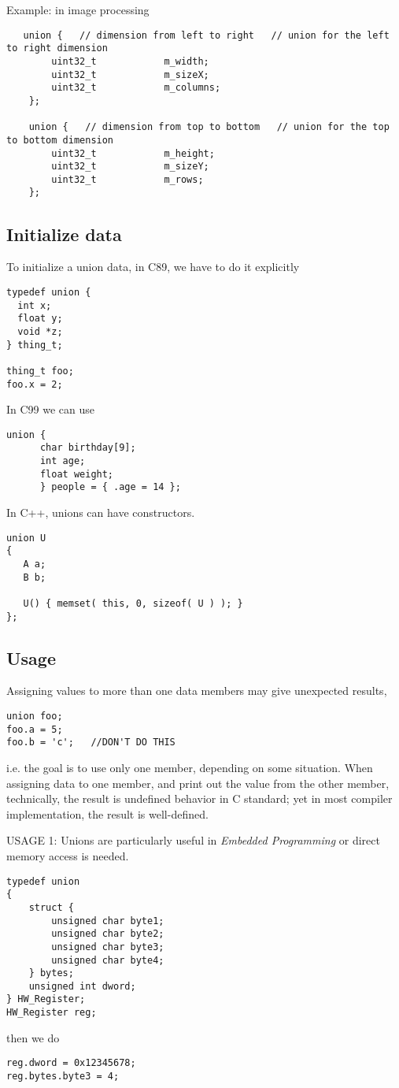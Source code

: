 Example: in image processing
\begin{Verbatim}
   union {   // dimension from left to right   // union for the left to right dimension
        uint32_t            m_width;
        uint32_t            m_sizeX;
        uint32_t            m_columns;
    };

    union {   // dimension from top to bottom   // union for the top to bottom dimension
        uint32_t            m_height;
        uint32_t            m_sizeY;
        uint32_t            m_rows;
    };
\end{Verbatim}

\subsection{Initialize data}

To initialize a union data, in C89, we have to do it explicitly
\begin{lstlisting}
typedef union {
  int x;
  float y;
  void *z;
} thing_t;

thing_t foo;
foo.x = 2;
\end{lstlisting}

In C99 we can use
\begin{lstlisting}
union {
      char birthday[9];
      int age;
      float weight;
      } people = { .age = 14 };
\end{lstlisting}

In C++, unions can have constructors.
\begin{lstlisting}
union U 
{
   A a;
   B b;

   U() { memset( this, 0, sizeof( U ) ); }
};
\end{lstlisting}


\subsection{Usage}
Assigning values to more than one data members may give unexpected results,
\begin{verbatim}
union foo;
foo.a = 5;
foo.b = 'c';   //DON'T DO THIS
\end{verbatim}
i.e. the goal is to use only one member, depending on some situation. When
assigning data to one member, and print out the value from the other member,
technically, the result is undefined behavior in C standard; yet in most
compiler implementation, the result is well-defined.

USAGE 1: Unions are particularly useful in {\it Embedded Programming} or direct
memory access is needed.
\begin{lstlisting}
typedef union
{
    struct {
        unsigned char byte1;
        unsigned char byte2;
        unsigned char byte3;
        unsigned char byte4;
    } bytes;
    unsigned int dword;
} HW_Register;
HW_Register reg;
\end{lstlisting}
then we do
\begin{lstlisting}
reg.dword = 0x12345678;
reg.bytes.byte3 = 4;
\end{lstlisting}

